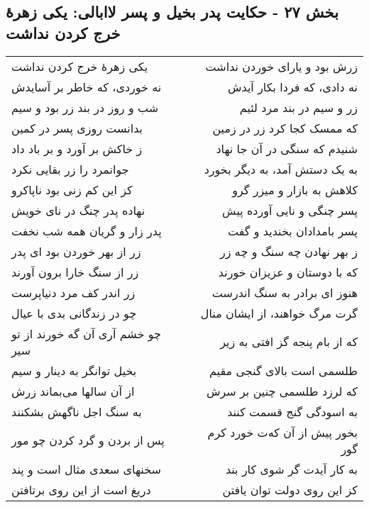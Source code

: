 \begin{center}
\section*{بخش ۲۷ - حکایت پدر بخیل و پسر لاابالی: یکی زهرهٔ خرج کردن نداشت}
\label{sec:027}
\begin{longtable}{l p{0.5cm} r}
یکی زهرهٔ خرج کردن نداشت
&&
زرش بود و یارای خوردن نداشت
\\
نه خوردی، که خاطر بر آسایدش
&&
نه دادی، که فردا بکار آیدش
\\
شب و روز در بند زر بود و سیم
&&
زر و سیم در بند مرد لئیم
\\
بدانست روزی پسر در کمین
&&
که ممسک کجا کرد زر در زمین
\\
ز خاکش بر آورد و بر باد داد
&&
شنیدم که سنگی در آن جا نهاد
\\
جوانمرد را زر بقایی نکرد
&&
به یک دستش آمد، به دیگر بخورد
\\
کز این کم زنی بود ناپاکرو
&&
کلاهش به بازار و میزر گرو
\\
نهاده پدر چنگ در نای خویش
&&
پسر چنگی و نایی آورده پیش
\\
پدر زار و گریان همه شب نخفت
&&
پسر بامدادان بخندید و گفت
\\
زر از بهر خوردن بود ای پدر
&&
ز بهر نهادن چه سنگ و چه زر
\\
زر از سنگ خارا برون آورند
&&
که با دوستان و عزیزان خورند
\\
زر اندر کف مرد دنیاپرست
&&
هنوز ای برادر به سنگ اندرست
\\
چو در زندگانی بدی با عیال
&&
گرت مرگ خواهند، از ایشان منال
\\
چو خشم آری آن گه خورند از تو سیر
&&
که از بام پنجه گز افتی به زیر
\\
بخیل توانگر به دینار و سیم
&&
طلسمی است بالای گنجی مقیم
\\
از آن سالها می‌بماند زرش
&&
که لرزد طلسمی چنین بر سرش
\\
به سنگ اجل ناگهش بشکنند
&&
به اسودگی گنج قسمت کنند
\\
پس از بردن و گرد کردن چو مور
&&
بخور پیش از آن که‌ت خورد کرم گور
\\
سخنهای سعدی مثال است و پند
&&
به کار آیدت گر شوی کار بند
\\
دریغ است از این روی برتافتن
&&
کز این روی دولت توان یافتن
\\
\end{longtable}
\end{center}
